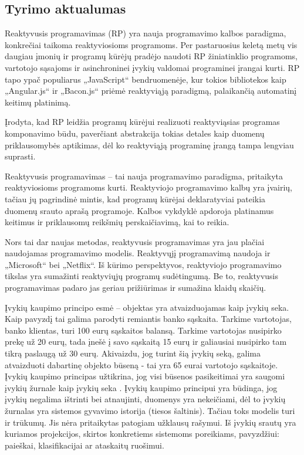 \subsection{Tyrimo aktualumas}

Reaktyvusis programavimas (RP) yra nauja programavimo kalbos paradigma, konkrečiai taikoma reaktyviosioms programoms. Per pastaruosius keletą metų vis daugiau įmonių ir programų kūrėjų pradėjo naudoti RP žiniatinklio programoms, vartotojo sąsajoms ir asinchroninei įvykių valdomai programinei įrangai kurti. RP tapo ypač populiarus „JavaScript“ bendruomenėje, kur tokios bibliotekos kaip „Angular.js“ ir „Bacon.js“ priėmė reaktyviąją paradigmą, palaikančią automatinį keitimų platinimą.

Įrodyta, kad RP leidžia programų kūrėjui realizuoti reaktyviąsias programas komponavimo būdu, paverčiant abstrakcija tokias detales kaip duomenų priklausomybės aptikimas, dėl ko reaktyviąją programinę įrangą tampa lengviau suprasti.

Reaktyvusis programavimas – tai nauja programavimo paradigma, pritaikyta reaktyviosioms programoms kurti. Reaktyviojo programavimo kalbų yra įvairių, tačiau jų pagrindinė mintis, kad programų kūrėjai deklaratyviai pateikia duomenų srauto aprašą programoje. Kalbos vykdyklė apdoroja platinamus keitimus ir priklausomų reikšmių perskaičiavimą, kai to reikia.

Nors tai dar naujas metodas, reaktyvusis programavimas yra jau plačiai naudojamas programavimo modelis. Reaktyvųjį programavimą naudoja ir „Microsoft“ bei „Netflix“. Iš kūrimo perspektyvos, reaktyviojo programavimo tikslas yra sumažinti reaktyviųjų programų sudėtingumą. Be to, reaktyvusis programavimas padaro jas geriau prižiūrimas ir sumažina klaidų skaičių.

Įvykių kaupimo principo esmė – objektas yra atvaizduojamas kaip įvykių seka. Kaip pavyzdį tai galima parodyti remiantis banko sąskaita. Tarkime vartotojas, banko klientas, turi 100 eurų sąskaitos balansą. Tarkime vartotojas nusipirko prekę už 20 eurų, tada įnešė į savo sąskaitą 15 eurų ir galiausiai nusipirko tam tikrą paslaugą už 30 eurų. Akivaizdu, jog turint šią įvykių seką, galima atvaizduoti dabartinę objekto būseną - tai yra 65 eurai vartotojo sąskaitoje. Įvykių kaupimo principas užtikrina, jog visi būsenos pasikeitimai yra saugomi įvykių žurnale kaip įvykių seka \cite{vernon2013implementing}. Įvykių kaupimo principui yra būdinga, jog įvykių negalima ištrinti bei atnaujinti, duomenys yra nekeičiami, dėl to įvykių žurnalas yra sistemos gyvavimo istorija (tiesos šaltinis). Tačiau toks modelis turi ir trūkumų. Jis nėra pritaikytas patogiam užklausų rašymui. Iš įvykių srautų yra kuriamos projekcijos, skirtos konkretiems sistemoms poreikiams, pavyzdžiui: paieškai, klasifikacijai ar ataskaitų ruošimui.

